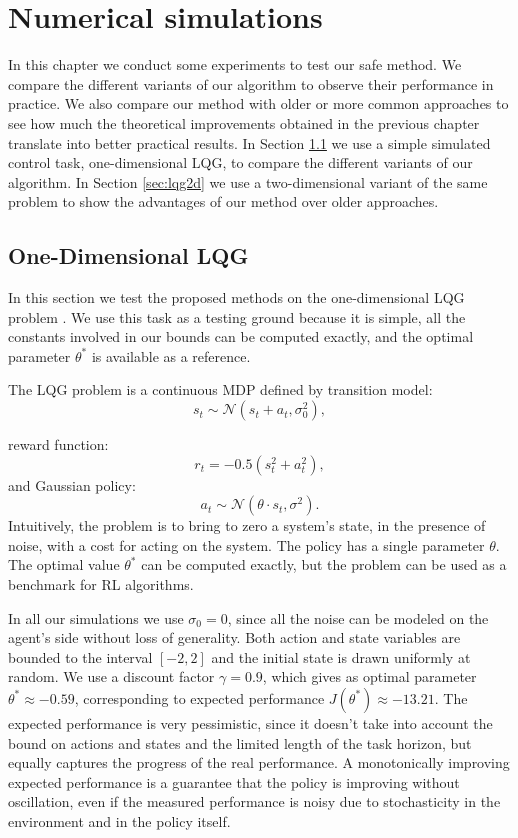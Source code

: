 \chapter{Numerical simulations}\label{sec:simul}

In this chapter we conduct some experiments to test our safe method. We compare the different variants of our algorithm to observe their performance in practice. We also compare our method with older or more common approaches to see how much the theoretical improvements obtained in the previous chapter translate into better practical results.
In Section \ref{sec:lqg1d} we use a simple simulated control task, one-dimensional \ac{LQG}, to compare the different variants of our algorithm.
In Section \ref{sec:lqg2d} we use a two-dimensional variant of the same problem to show the advantages of our method over older approaches. 

\section{One-Dimensional LQG}\label{sec:lqg1d}
In this section we test the proposed methods on the one-dimensional \ac{LQG} problem \cite{4867}. We use this task as a testing ground because it is simple, all the constants involved in our bounds can be computed exactly, and the optimal parameter $\theta^*$ is available as a reference.

The LQG problem is a continuous \ac{MDP} defined by transition model:
\[
	s_t \sim \mathcal{N}(s_t+a_t,\sigma_0^2),
\] 

reward function:
\[
	r_t=-0.5(s_t^2+a_t^2),
\]
and Gaussian policy:
\[
	a_t \sim \mathcal{N}(\theta\cdot s_t,\sigma^2).
\]
Intuitively, the problem is to bring to zero a system's state, in the presence of noise, with a cost for acting on the system.
The policy has a single parameter $\theta$. The optimal value $\theta^*$ can be computed exactly, but the problem can be used as a benchmark for \ac{RL} algorithms.

In all our simulations we use $\sigma_0 = 0$, since all the noise can be modeled on the agent's side without loss of generality. Both action and state variables are bounded to the interval $[-2,2]$ and the initial state is drawn uniformly at random.  
We use a discount factor $\gamma=0.9$, which gives as optimal parameter $\theta^* \approx -0.59$, corresponding to expected performance $J(\theta^*) \approx -13.21$. The expected performance is very pessimistic, since it doesn't take into account the bound on actions and states and the limited length of the task horizon, but equally captures the progress of the real performance. A monotonically improving expected performance is a guarantee that the policy is improving without oscillation, even if the measured performance is noisy due to stochasticity in the environment and in the policy itself.
